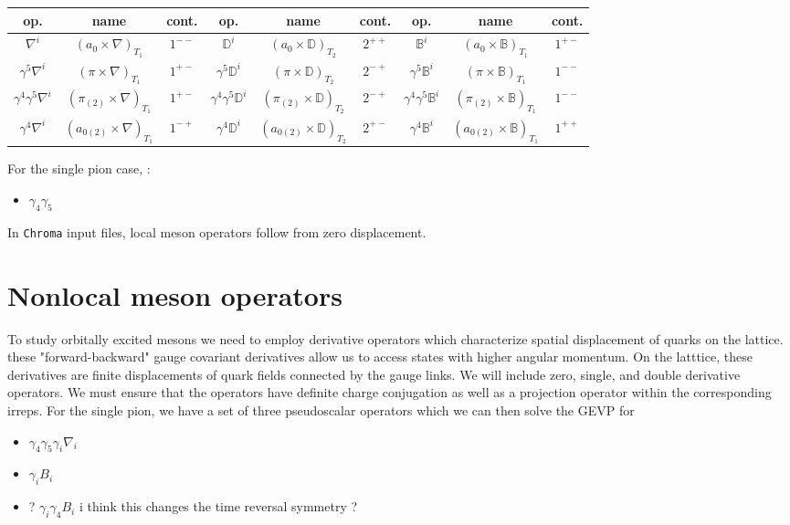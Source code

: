 \begin{table}
\begin{tabular}{ccc|ccc|ccc}
    op. & name & cont.  & op. & name & cont. & op. & name & cont.\\
    \hline
    $\nabla^i$ & $(a_0 \times \nabla)_{T_1}$ & $1^{--}$ & $\mathbb{D}^i $ & $(a_0
    \times \mathbb{D})_{T_2}$ & $2^{++}$ & $\mathbb{B}^i$ & $(a_0
    \times \mathbb{B})_{T_1}$ & $1^{+-}$ \\
    $\gamma^5 \nabla^i$ & $(\pi \times \nabla)_{T_1}$ & $1^{+-}$  &
    $\gamma^5 \mathbb{D}^i $ & $(\pi
    \times \mathbb{D})_{T_2}$ & $2^{-+}$ & $\gamma^5 \mathbb{B}^i$ & $(\pi
    \times \mathbb{B})_{T_1}$ & $1^{--}$ \\
    $\gamma^4 \gamma^5 \nabla^i$ & $(\pi_{(2)} \times \nabla)_{T_1}$ &
    $1^{+-}$ & $\gamma^4 \gamma^5 \mathbb{D}^i $ & $(\pi_{(2)}
    \times \mathbb{D})_{T_2}$ & $2^{-+}$ & $\gamma^4 \gamma^5 \mathbb{B}^i$ & $(\pi_{(2)}
    \times \mathbb{B})_{T_1}$ & $1^{--}$ \\
    $\gamma^4 \nabla^i$ & $(a_{0(2)} \times \nabla)_{T_1}$ & $1^{-+}$ &
    $\gamma^4 \mathbb{D}^i $ & $(a_{0(2)}
    \times \mathbb{D})_{T_2}$ & $2^{+-}$ & $\gamma^4 \mathbb{B}^i$ & $(a_{0(2)}
    \times \mathbb{B})_{T_1}$ & $1^{++}$ \\

\end{tabular}


For the single pion case, : 
\begin{itemize}
    \item $\gamma_4\gamma_5$

\end{itemize}
In \texttt{Chroma} input files, local meson operators follow from zero displacement. 

\section{Nonlocal meson operators}
To study orbitally excited mesons we need to employ derivative operators which characterize spatial displacement of quarks on the lattice.
these "forward-backward" gauge covariant derivatives allow us to access states with higher angular momentum. On the latttice, these derivatives are finite displacements of quark fields connected by the gauge links. We will include zero, single, and double derivative operators. We must ensure that the operators have definite charge conjugation as well as a projection operator within the corresponding irreps. \cite{liao2002excitedcharmoniumspectrumanisotropic}
For the single pion, we have a set of three pseudoscalar operators which we can then solve the GEVP for
\begin{itemize} 
    \item $\gamma_4\gamma_5\gamma_i \nabla_i$
    \item $\gamma_iB_i$ 
    \item ? $\gamma_i\gamma_4B_i$ i think this changes the time reversal symmetry ? 
    

\end{itemize}
\end{table}
